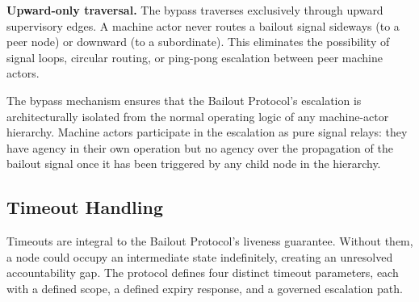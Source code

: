 \bigskip
\noindent\textbf{Upward-only traversal.} The bypass traverses exclusively through upward supervisory edges. A machine actor never routes a bailout signal sideways (to a peer node) or downward (to a subordinate). This eliminates the possibility of signal loops, circular routing, or ping-pong escalation between peer machine actors.

The bypass mechanism ensures that the Bailout Protocol's escalation is architecturally isolated from the normal operating logic of any machine-actor hierarchy. Machine actors participate in the escalation as pure signal relays: they have agency in their own operation but no agency over the propagation of the bailout signal once it has been triggered by any child node in the hierarchy.

\subsection{Timeout Handling}
\label{sec:timeouts}

Timeouts are integral to the Bailout Protocol's liveness guarantee. Without them, a node could occupy an intermediate state indefinitely, creating an unresolved accountability gap. The protocol defines four distinct timeout parameters, each with a defined scope, a defined expiry response, and a governed escalation path.

